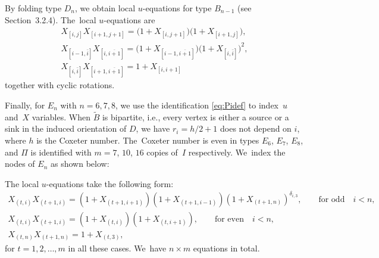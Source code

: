 \documentclass[10pt,a4paper]{amsart}
\def\tB{{\tilde B}}
\def\tB{{\tilde B}}
\numberwithin{equation}{section}
\begin{document}
\medskip{}
By folding type $D_n$, we obtain local $u$-equations for type $B_{n-1}$ (see Section~3.2.4). The~local $u$-equations are
\begin{gather*}
X_{[i,j]} X_{[i{+}1, j{+}1]}=\big(1+X_{[i,j{+}1]}\big)\big(1+X_{[i{+}1, j]}\big),
\\
X_{[i{-}1,\bar i]} X_{[i, \overline{i{+}1}]}=\big(1+X_{[i{-}1, \overline{i{+}1}]}\big)\big(1+X_{[i,\bar i]}\big)^2,
\\
X_{[i,\bar i]} X_{[i+1,\overline{i+1}]}=1+X_{[i, i{+}1]}
\end{gather*}
together with cyclic rotations.

\medskip{}
Finally, for $E_n$ with $n=6,7,8$, we use the identification \eqref{eq:Pidef} to index~$u$ and~$X$ variables. When $\tB$ is bipartite, i.e., every vertex is either a source or a sink in the induced orientation of $D$, we have $r_i = h/2+1$ does not depend on $i$, where $h$ is the Coxeter number. The~Coxeter number is even in types $E_6$, $ E_7$, $E_8$, and $\Pi$ is identified with $m=7$, $10$, $16$ copies of~$I$ respectively. We~index the nodes of $E_n$ as shown below:
\begin{center} 
\end{center}
The local $u$-equations take the following form:
\begin{gather*}
X_{(t,i)}X_{(t+1,i)}=(1+X_{(t+1,i{+}1)})(1+X_{(t+1,i{-}1)})(1+X_{(t+1,n)})^{\delta_{i,3}}, \qquad \text{for~odd}\quad i<n,
\\
X_{(t,i)}X_{(t+1,i)}=(1+X_{(t,i)})(1+X_{(t,i{+}1)}), \qquad \text{for~even}\quad i<n,
\\
 X_{(t,n)}X_{(t+1,n)}=1+X_{(t,3)},
\end{gather*}
for $t=1,2,\dots, m$ in all these cases. We~have $n\times m$ equations in total.
\end{document}

